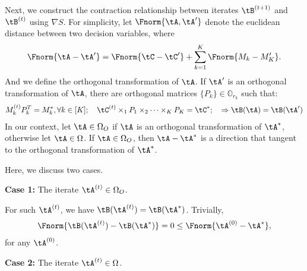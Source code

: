 \documentclass[11pt]{article}
\begin{document}
Next, we construct the contraction relationship between iterates $\tB^{(t+1)}$ and $\tB^{(t)}$ using $\nabla S$. For simplicity, let $\Fnorm{\tA,\tA'}$ denote the euclidean distance between two decision variables, where 
\begin{align*}
	\Fnorm{\tA-\tA'} = \Fnorm{\tC - \tC'} + \sum_{k=1}^K \Fnorm{M_k - M'_K}.
\end{align*}
And we define the orthogonal transformation of $\tA$. If $\tA'$ is an orthogonal transformation of $\tA$, there are orthogonal matrices $\{P_k\} \in \mathbb{O}_{r_k}$ such that:
\begin{align*}
	M^{(t)}_k P^T_k = M^*_k , \forall k \in [K]; \quad \tC^{(t)} \times_1 P_1 \times_2  \dots \times_K P_K = \tC^*; \quad 
	\Rightarrow \tB(\tA) = \tB(\tA')
\end{align*}
In our context, let $\tA \in \Omega_O$ if $\tA$ is an orthogonal transformation of $\tA^*$, otherwise let $\tA \in \Omega$. If $\tA \in \Omega_O$, then $\tA - \tA^*$ is a direction that tangent to the orthogonal transformation of $\tA^*$. 


Here, we discuss two cases. 



\textbf{Case 1:} The iterate $\tA^{(t)} \in \Omega_O$.

For such $\tA^{(t)}$, we have $\tB(\tA^{(t)}) = \tB(\tA^*)$. Trivially, 
\begin{align}\label{pro:case1}
	\Fnorm{\tB(\tA^{(t)}) - \tB(\tA^*)} = 0 \leq \Fnorm{\tA^{(0)} - \tA^*},
\end{align}
for any $\tA^{(0)}$.

\textbf{Case 2:} The iterate $\tA^{(t)} \in \Omega$.
\end{document}
